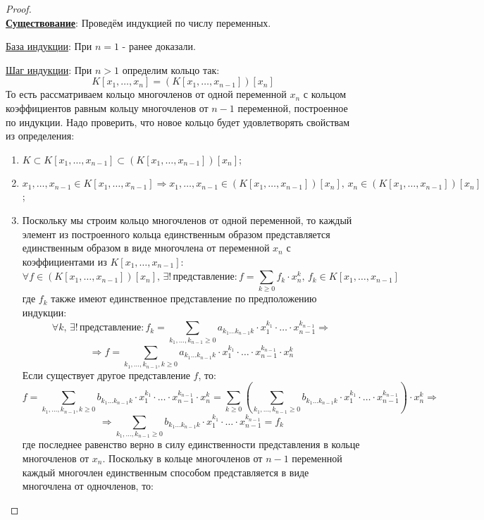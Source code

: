 \documentclass[12pt]{article}
\theoremstyle{definition}
\newcommand{\ddsum}[2]{\displaystyle\sum\limits_{#1}^{#2}}
\begin{document}
\begin{proof}\hfill\\
	\textbf{\uline{Существование}}: Проведём индукцией по числу переменных.
	
	\uline{База индукции}: При $n = 1$ - ранее доказали.
	
	\uline{Шаг индукции}: При $n > 1$ определим кольцо так:
	$$
		K[x_1,\dotsc, x_n] = \left(K[x_1,\dotsc,x_{n-1}]\right)[x_n]
	$$ 
	То есть рассматриваем кольцо многочленов от одной переменной $x_n$ с кольцом коэффициентов равным кольцу многочленов от $n-1$ переменной, построенное по индукции. Надо проверить, что новое кольцо будет удовлетворять свойствам из определения:
	\begin{enumerate}[label=\arabic*)]
		\item $K \subset K[x_1,\dotsc,x_{n-1}] \subset \left(K[x_1,\dotsc,x_{n-1}]\right)[x_n]$;
		\item $x_1,\dotsc,x_{n-1} \in K[x_1,\dotsc,x_{n-1}] \Rightarrow x_1,\dotsc,x_{n-1} \in \left(K[x_1,\dotsc,x_{n-1}]\right)[x_n], \, x_n \in \left(K[x_1,\dotsc,x_{n-1}]\right)[x_n]$;
		\item Поскольку мы строим кольцо многочленов от одной переменной, то каждый элемент из построенного кольца единственным образом представляется единственным образом в виде многочлена от переменной $x_n$ с коэффициентами из $K[x_1,\dotsc,x_{n-1}]$:
		$$
			\forall f \in \left(K[x_1,\dotsc,x_{n-1}]\right)[x_n], \, \exists! \, \text{представление}\colon f = \ddsum{k\geq 0}{}f_k{\cdot}x_n^k, \, f_k \in K[x_1,\dotsc,x_{n-1}]
		$$
		где $f_k$ также имеют единственное представление по предположению индукции:
		$$
			\forall k, \, \exists! \, \text{представление}\colon f_k =\ddsum{k_1,\dotsc, k_{n-1} \geq 0}{}a_{k_1\dotsc k_{n-1}k}{\cdot}x_1^{k_1}{\cdot}\dotsc{\cdot}x_{n-1}^{k_{n-1}} \Rightarrow
		$$
		$$
			\Rightarrow f = \ddsum{k_1,\dotsc,k_{n-1},k \geq 0}{}a_{k_1\dotsc k_{n-1}k}{\cdot}x_1^{k_1}{\cdot}\dotsc{\cdot}x_{n-1}^{k_{n-1}}{\cdot}x_n^k
		$$
		Если существует другое представление $f$, то:
		$$
			f = \ddsum{k_1,\dotsc,k_{n-1},k \geq 0}{}b_{k_1\dotsc k_{n-1}k}{\cdot}x_1^{k_1}{\cdot}\dotsc{\cdot}x_{n-1}^{k_{n-1}}{\cdot}x_n^k = \ddsum{k \geq 0}{}\left( \ddsum{k_1,\dotsc,k_{n-1} \geq 0}{}b_{k_1\dotsc k_{n-1}k}{\cdot}x_1^{k_1}{\cdot}\dotsc{\cdot}x_{n-1}^{k_{n-1}}\right){\cdot}x_n^k \Rightarrow
		$$
		$$
			\Rightarrow \ddsum{k_1,\dotsc,k_{n-1} \geq 0}{}b_{k_1\dotsc k_{n-1}k}{\cdot}x_1^{k_1}{\cdot}\dotsc{\cdot}x_{n-1}^{k_{n-1}} = f_k
		$$
		где последнее равенство верно в силу единственности представления в кольце многочленов от $x_n$. Поскольку в кольце многочленов от $n-1$ переменной каждый многочлен единственным способом представляется в виде многочлена от одночленов, то:

\end{enumerate}
\end{proof}
\end{document}
